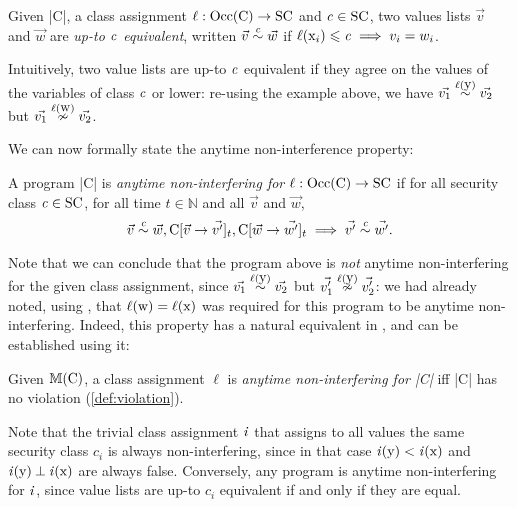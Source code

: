 \begin{definition} Given \prc|C|, a class
assignment \(\ell : \Occ(\prc|C|) \to \SC\) and \(\mathit{c} \in \mathrm{SC}\), two values
lists \(\vec{v}\) and \(\vec{w}\) are \emph{up-to \(\mathit{c}\) equivalent},
written \(\vec{v} \upce{\scl{c}} \vec{w}\) if \(\ell(\prc|x$_i$|) \leqslant
\scl{c} \implies v_i=w_i\). \end{definition}

Intuitively, two value lists are up-to \(\mathit{c}\) equivalent if they agree on
the values of the variables of class \(\mathit{c}\) or lower: re-using the example
above, we have \(\vec{v_1} \upce{\lvl{\prc|y|}} \vec{v_2}\) but  \(\vec{v_1}
\nupce{\lvl{\prc|w|}} \vec{v_2}\).

We can now formally state the anytime non-interference property:

\begin{definition}%
\label{def:com-ni}
A program \prc|C| is \emph{anytime non-interfering for \(\ell : \Occ(\prc|C|)
\to \SC\)} if for all security class \(\mathit{c} \in \mathrm{SC}\), for all time \(t \in
\mathbb{N}\) and all \(\vec{v}\) and \(\vec{w}\),
\[
\vec{v}\upce{\scl{c}} \vec{w}, \prc|C|[\vec{v} \rightarrow \vec{v'}]_t,
\prc|C|[\vec{w} \rightarrow \vec{w'}]_t \implies \vec{v'}\upce{\scl{c}}
\vec{w'}\text{.}
\]
\end{definition}

Note that we can conclude that the program above is \emph{not} anytime
non-interfering for the given class assignment, since \(\vec{v_1}
\upce{\lvl{\prc|y|}} \vec{v_2}\) but \(\vec{v_1'} \nupce{\lvl{\prc|y|}}
\vec{v_2'}\): we had already noted, using \lname, that \(\ell(\prc|w|) =
\ell(\prc|x|)\) was required for this program to be anytime non-interfering.
Indeed, this property has a natural equivalent in \lname, and can be established
using it:

\begin{definition}%
\label{def:level-ni}
Given $\sfm{\prc|C|}$, a class assignment \(\ell\) is \emph{anytime
non-interfering for \prc|C|} iff \prc|C| has no violation
(\autoref{def:violation}).
\end{definition}

Note that the trivial class assignment \(\mathit{i}\) that assigns to all values
the same security class \(c_i\) is always non-interfering, since in that case
\(\scl{i}(\prc|y|) < \scl{i}(\prc|x|)\) and \(\scl{i}(\prc|y|) \orth
\scl{i}(\prc|x|)\) are always false. Conversely, any program is anytime
non-interfering for \(\mathit{i}\), since value lists are up-to \(c_i\) equivalent
if and only if they are equal.

